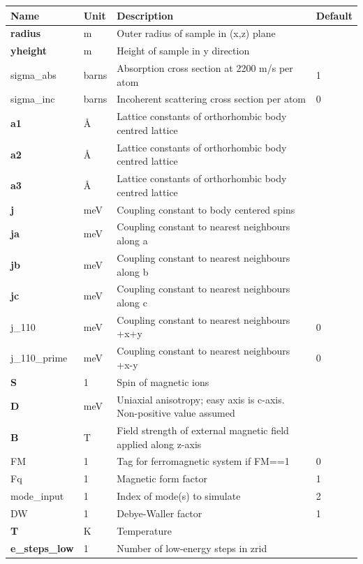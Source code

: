 \begin{longtable}{p{}p{}p{}p{}}
\toprule
\textbf{Name} & \textbf{Unit} & \textbf{Description} & \textbf{Default} \\
\midrule
\endhead
\textbf{radius} & m & Outer radius of sample in (x,z) plane &  \\
\textbf{yheight} & m & Height of sample in y direction &  \\
sigma\_abs & barns & Absorption cross section at 2200 m/s per atom & 1 \\
sigma\_inc & barns & Incoherent scattering cross section per atom & 0 \\
\textbf{a1} & \AA{} & Lattice constants of orthorhombic body centred lattice &  \\
\textbf{a2} & \AA{} & Lattice constants of orthorhombic body centred lattice &  \\
\textbf{a3} & \AA{} & Lattice constants of orthorhombic body centred lattice &  \\
\textbf{j} & meV & Coupling constant to body centered spins &  \\
\textbf{ja} & meV & Coupling constant to nearest neighbours along a &  \\
\textbf{jb} & meV & Coupling constant to nearest neighbours along b &  \\
\textbf{jc} & meV & Coupling constant to nearest neighbours along c &  \\
j\_110 & meV & Coupling constant to nearest neighbours +x+y & 0 \\
j\_110\_prime & meV & Coupling constant to nearest neighbours +x-y & 0 \\
\textbf{S} & 1 & Spin of magnetic ions &  \\
\textbf{D} & meV & Uniaxial anisotropy; easy axis is c-axis. Non-positive value assumed &  \\
\textbf{B} & T & Field strength of external magnetic field applied along z-axis &  \\
FM & 1 & Tag for ferromagnetic system if FM==1 & 0 \\
Fq & 1 & Magnetic form factor & 1 \\
mode\_input & 1 & Index of mode(s) to simulate & 2 \\
DW & 1 & Debye-Waller factor & 1 \\
\textbf{T} & K & Temperature &  \\
\textbf{e\_steps\_low} & 1 & Number of low-energy steps in zrid &  \\

\end{longtable}
